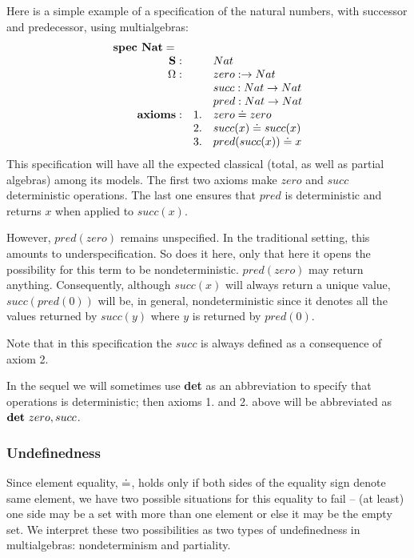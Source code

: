 \documentclass[10pt]{article}
\begin{document}
\begin{example}\label{ex:A}
Here is a simple example of a specification of the natural
numbers, with successor and predecessor, using multialgebras:
 \[ \begin{array}{r@{\hspace*{1em}}llll}
 \mbox{\bf spec\ Nat} =\ \ \\
	\Sorts:	&& Nat \\			
	\Ops: 	&& zero: \to Nat\\
		&& succ: Nat \to Nat\\
		&& pred: Nat \to Nat\\	
	{\bf axioms}: 	
		&1.& zero \eleq  zero \\
		&2.& succ(x) \eleq succ(x) \\
		&3.& pred(succ(x)) \eleq  x 
\end{array} \] 
This specification will have all the expected classical (total, as well as
partial algebras) among its models.  The first two axioms make $zero$ and
$succ$ deterministic operations. The last one ensures that $pred$ is
deterministic and returns $x$ when applied to $succ(x)$. 

However,
$pred(zero)$ remains unspecified. In the traditional setting, this amounts to
underspecification. So does it here, only that here it opens the possibility
for this term to be nondeterministic. $pred(zero)$ may return anything.
Consequently, although $succ(x)$
will always return a unique value, $succ(pred(0))$
will be, in general,  nondeterministic since it denotes all the
values returned by $succ(y)$ where $y$ is returned by $pred(0)$. 

Note that in this
specification  the $succ$ is always defined as a consequence of axiom 2.
\end{example}
%
In the sequel we will sometimes use {\bf det} as an abbreviation to specify
that operations is deterministic; then axioms 1. and 2. above will be
abbreviated as ${\bf det}\ zero, succ$.

\subsubsection{Undefinedness}
Since element equality, $\mathrel{\dot{=} }$, holds only if both
sides of the equality sign denote same element, we have two possible
situations for this equality to fail -- (at least) one side may be a set with
more than one element or else it may be the empty set. We interpret these two
possibilities as two types of undefinedness in
multialgebras: nondeterminism and partiality.
\end{document}
